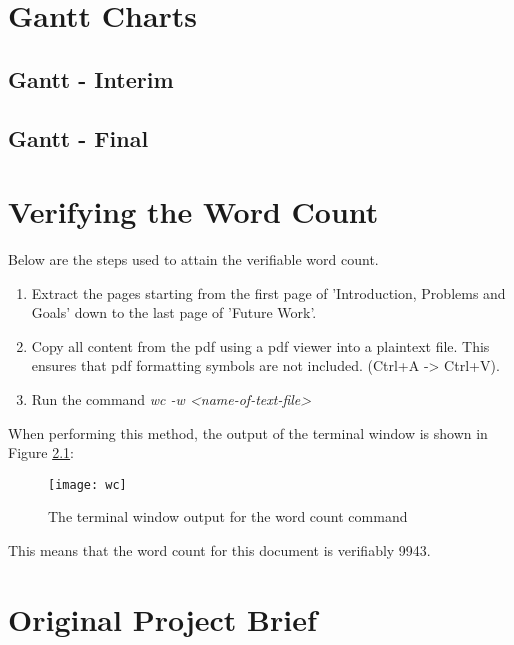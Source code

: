 \chapter{Gantt Charts}
\newpage
\section{Gantt - Interim} \label{gc-interim}
\begin{center}
\end{center}

\section{Gantt - Final} \label{gc-final}
\begin{center}
\end{center}

\chapter{Verifying the Word Count}
Below are the steps used to attain the verifiable word count.
\begin{enumerate}
	\item Extract the pages starting from the first page of 'Introduction, Problems and Goals' down to the last page of 'Future Work'.
	\item Copy all content from the pdf using a pdf viewer into a plaintext file. This ensures that pdf formatting symbols are not included. (Ctrl+A -> Ctrl+V).
	\item Run the command \emph{wc -w <name-of-text-file>}
\end{enumerate}

When performing this method, the output of the terminal window is shown in Figure \ref{wc}:\\

\begin{figure}[H]
	\centering
	\texttt{[image: wc]}
	\caption{The terminal window output for the word count command} \label{wc}
\end{figure}

This means that the word count for this document is verifiably 9943.

\chapter{Original Project Brief}
